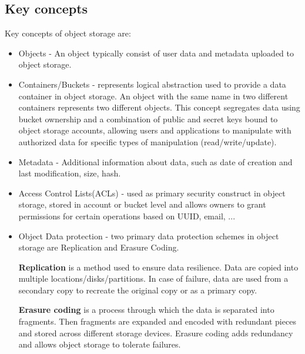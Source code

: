     \subsection*{Key concepts}
    Key concepts of object storage are\cite{ibmObjectStorage}:
    \begin{itemize}
        \item Objects - An object typically consist of user data and metadata uploaded to object storage.
        \item Containers/Buckets - represents logical abstraction used to provide a data container in object storage. An object with the same name in two different containers represents two different objects. This concept segregates data using bucket ownership and a combination of public and secret keys bound to object storage accounts, allowing users and applications to manipulate with authorized data for specific types of manipulation (read/write/update).
        \item Metadata - Additional information about data, such as date of creation and last modification, size, hash.
        \item Access Control Lists(ACLs) - used as primary security construct in object storage, stored in account or bucket level and allows owners to grant permissions for certain operations based on UUID, email, ...
        \item Object Data protection - two primary data protection schemes in object storage are Replication and Erasure Coding.

        \textbf{Replication} is a method used to ensure data resilience. Data are copied into multiple locations/disks/partitions. In case of failure, data are used from a secondary copy to recreate the original copy or as a primary copy.

        \textbf{Erasure coding} is a process through which the data is separated into fragments. Then fragments are expanded and encoded with redundant pieces and stored across different storage devices. Erasure coding adds redundancy and allows object storage to tolerate failures.
    \end{itemize}


